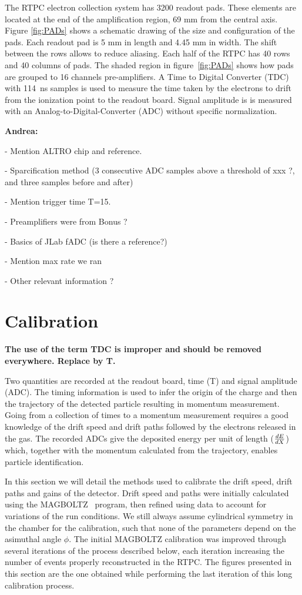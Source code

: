 \documentclass[twocolumn,showpacs,superscriptaddress,groupedaddress]{revtex4}
\begin{document}
The RTPC electron collection system has 3200 readout pads. These elements are
located at the end of the amplification region, 69 mm from the central axis.
Figure \ref{fig:PADs} shows a schematic drawing of the size and 
configuration of the pads. Each readout pad is 5 mm in length and 4.45 mm in 
width.  The shift between the rows allows to reduce aliasing. Each half of the 
RTPC has 40 rows and 40 columns of pads. The shaded region in figure~\ref{fig:PADs}
shows how pads are grouped to 16 channels pre-amplifiers.  A Time to Digital
Converter (TDC) with 114~ns samples is used to measure the time taken by
the electrons to drift from the ionization point to the readout board.  Signal
amplitude is is measured with an Analog-to-Digital-Converter (ADC) without
specific normalization. 

{\bf \color{red} 
Andrea:

- Mention ALTRO chip and reference.

- Sparcification method (3 consecutive ADC samples above a threshold of xxx ?, and three
samples before and after) 

- Mention trigger time T=15.

- Preamplifiers were from Bonus ?

- Basics of JLab fADC (is there a reference?)

- Mention max rate we ran 

- Other relevant information ?
}

\section{Calibration} \label{sec_calib}

{\bf \color{red} The use of the term TDC is improper and should be removed
everywhere. Replace by T.}

Two quantities are recorded at the readout board, 
time (T) and signal amplitude (ADC). The timing information is used to infer 
the origin of the charge and then the trajectory of the detected particle
resulting in momentum measurement. Going from a collection of 
times to a momentum measurement requires a good knowledge of the drift speed 
and drift paths followed by the electrons released in the gas. The recorded ADCs give 
the deposited energy per unit of length ($\small{\frac{dE}{dX}}$) which, 
together with the momentum calculated from the trajectory, enables particle 
identification.

In this section we will detail the methods used to calibrate the drift speed,
drift paths and gains of the detector. Drift speed and paths were initially
calculated using the MAGBOLTZ~\cite{MAGBOLTZ} program, then refined using
data to account for variations of the run conditions. We still always assume 
cylindrical symmetry in the chamber for the calibration, such that none of
the parameters depend on the asimuthal angle $\phi$. The initial MAGBOLTZ
calibration was improved through several iterations of the
process described below, each iteration increasing the number of events 
properly reconstructed in the RTPC. The figures presented in this section
are the one obtained while performing the last iteration of this long 
calibration process.
\end{document}
